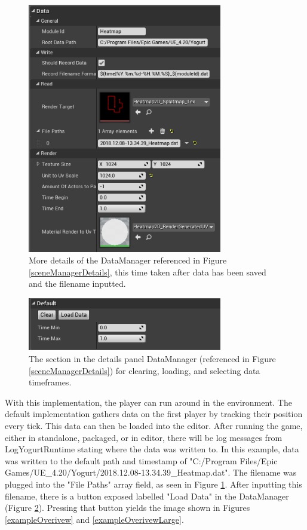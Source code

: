 \documentclass[journal]{IEEEtran}
\begin{document}
\begin{figure}[ht]
\includegraphics[width=8.5cm]{"scene_manager_details_expanded"}
\caption{More details of the DataManager referenced in Figure \ref{sceneManagerDetails}, this time taken after data has been saved and the filename inputted.}
\label{sceneManagerDetailsExpanded}
\end{figure}

\begin{figure}[ht]
\includegraphics[width=8.5cm]{"scene_manager_details_loading"}
\caption{The section in the details panel DataManager (referenced in Figure \ref{sceneManagerDetails}) for clearing, loading, and selecting data timeframes.}
\label{sceneManagerDetailsLoading}
\end{figure}

With this implementation, the player can run around in the environment. The default implementation gathers data on the first player by tracking their position every tick. This data can then be loaded into the editor. After running the game, either in standalone, packaged, or in editor, there will be log messages from LogYogurtRuntime stating where the data was written to. In this example, data was written to the default path and timestamp of "C:/Program Files/Epic Games/UE\_4.20/Yogurt/2018.12.08-13.34.39\_Heatmap.dat". The filename was plugged into the "File Paths" array field, as seen in Figure \ref{sceneManagerDetailsExpanded}. After inputting this filename, there is a button exposed labelled "Load Data" in the DataManager (Figure \ref{sceneManagerDetailsLoading}). Pressing that button yields the image shown in Figures \ref{exampleOverivew} and \ref{exampleOverivewLarge}.
\end{document}
